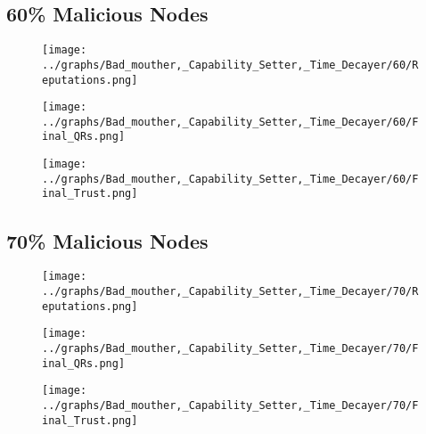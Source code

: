 \documentclass{article}
\begin{document}
  \begin{minipage}[t]{0.49\columnwidth}
    \subsection*{60\% Malicious Nodes}
        \begin{figure}[H]
            \centering
            \texttt{[image: ../graphs/Bad\_mouther,\_Capability\_Setter,\_Time\_Decayer/60/Reputations.png]}
        \end{figure}
        \begin{figure}[H]
            \centering
            \texttt{[image: ../graphs/Bad\_mouther,\_Capability\_Setter,\_Time\_Decayer/60/Final\_QRs.png]}
        \end{figure}
    \end{minipage}
    \begin{minipage}[t]{0.49\columnwidth}
        \begin{figure}[H]
            \centering
            \texttt{[image: ../graphs/Bad\_mouther,\_Capability\_Setter,\_Time\_Decayer/60/Final\_Trust.png]}
        \end{figure}
    \end{minipage}

  \begin{minipage}[t]{0.49\columnwidth}
    \subsection*{70\% Malicious Nodes}
        \begin{figure}[H]
            \centering
            \texttt{[image: ../graphs/Bad\_mouther,\_Capability\_Setter,\_Time\_Decayer/70/Reputations.png]}
        \end{figure}
        \begin{figure}[H]
            \centering
            \texttt{[image: ../graphs/Bad\_mouther,\_Capability\_Setter,\_Time\_Decayer/70/Final\_QRs.png]}
        \end{figure}
    \end{minipage}
    \begin{minipage}[t]{0.49\columnwidth}
        \begin{figure}[H]
            \centering
            \texttt{[image: ../graphs/Bad\_mouther,\_Capability\_Setter,\_Time\_Decayer/70/Final\_Trust.png]}
        \end{figure}
    \end{minipage}
\end{document}
